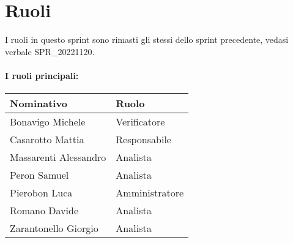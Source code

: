 \section{Ruoli}

I ruoli in questo sprint sono rimasti gli stessi dello sprint precedente, vedasi verbale SPR\_20221120.

\paragraph{I ruoli principali:}

\begin{center}
    \begin{tabularx}{\textwidth}{X l}
        
        \rowcolor{gray!30} \textbf{Nominativo} & \textbf{Ruolo}\\
        
        \hline

        Bonavigo Michele & Verificatore \\
        \rowcolor{gray!10}Casarotto Mattia & Responsabile \\
        Massarenti Alessandro & Analista \\
        \rowcolor{gray!10}Peron Samuel & Analista \\
        Pierobon Luca & Amministratore \\
        \rowcolor{gray!10}Romano Davide & Analista \\
        Zarantonello Giorgio & Analista \\

    \end{tabularx}
\end{center}
